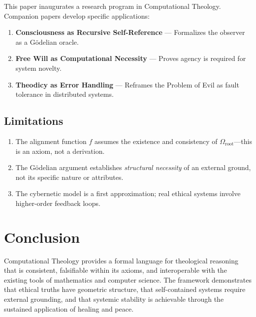 \documentclass[12pt, a4paper]{article}
\theoremstyle{plain}
\theoremstyle{definition}
\begin{document}
This paper inaugurates a research program in Computational Theology. Companion
papers develop specific applications:
\begin{enumerate}
  \item \textbf{Consciousness as Recursive Self-Reference} --- Formalizes
    the observer as a G\"odelian oracle.
  \item \textbf{Free Will as Computational Necessity} --- Proves agency
    is required for system novelty.
  \item \textbf{Theodicy as Error Handling} --- Reframes the Problem of
    Evil as fault tolerance in distributed systems.
\end{enumerate}

\subsection{Limitations}
\begin{enumerate}
  \item The alignment function $f$ assumes the existence and consistency
    of $\Omega_{\text{root}}$---this is an axiom, not a derivation.
  \item The G\"odelian argument establishes \emph{structural necessity}
    of an external ground, not its specific nature or attributes.
  \item The cybernetic model is a first approximation; real ethical
    systems involve higher-order feedback loops.
\end{enumerate}

\section{Conclusion}\label{sec:conclusion}

Computational Theology provides a formal language for theological reasoning
that is consistent, falsifiable within its axioms, and interoperable with
the existing tools of mathematics and computer science. The framework
demonstrates that ethical truths have geometric structure, that self-contained
systems require external grounding, and that systemic stability is achievable
through the sustained application of healing and peace.


\vspace{2em}
\noindent\hrulefill
\vspace{1em}



\end{document}
